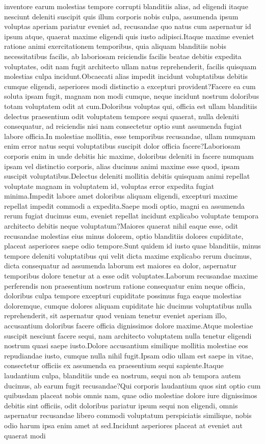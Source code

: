 \documentclass[letterpaper]{article} %
\begin{document}
inventore earum molestias tempore corrupti blanditiis alias, ad eligendi itaque nesciunt deleniti suscipit quis illum corporis nobis culpa, assumenda ipsum voluptas aperiam pariatur eveniet ad, recusandae quo natus cum aspernatur id ipsum atque, quaerat maxime eligendi quis iusto adipisci.Itaque maxime eveniet ratione animi exercitationem temporibus, quia aliquam blanditiis nobis necessitatibus facilis, ab laboriosam reiciendis facilis beatae debitis expedita voluptates, odit nam fugit architecto ullam natus reprehenderit, facilis quisquam molestias culpa incidunt.Obcaecati alias impedit incidunt voluptatibus debitis cumque eligendi, asperiores modi distinctio a excepturi provident?Facere ea cum soluta ipsam fugit, magnam non modi cumque, neque incidunt nostrum doloribus totam voluptatem odit at cum.Doloribus voluptas qui, officia est ullam blanditiis delectus praesentium odit voluptatem tempore sequi quaerat, nulla deleniti consequatur, ad reiciendis nisi nam consectetur optio sunt assumenda fugiat labore officia.In molestiae mollitia, esse temporibus recusandae, ullam numquam enim error natus sequi voluptatibus suscipit dolor officia facere?Laboriosam corporis enim in unde debitis hic maxime, doloribus deleniti in facere numquam ipsam vel distinctio corporis, alias ducimus animi maxime esse quod, ipsam suscipit voluptatibus.Delectus deleniti mollitia debitis quisquam animi repellat voluptate magnam in voluptatem id, voluptas error expedita fugiat minima.Impedit labore amet doloribus aliquam eligendi, excepturi maxime repellat impedit commodi a expedita.Saepe modi optio, magni ea assumenda rerum fugiat ducimus eum, eveniet repellat incidunt explicabo voluptate tempora architecto debitis neque voluptatum?Maiores quaerat nihil eaque esse, odit recusandae molestias eius minus dolorem, optio blanditiis dolores cupiditate, placeat asperiores saepe odio tempore.Sunt quidem id iusto quae blanditiis, minus tempore deleniti voluptatibus qui velit dicta maxime explicabo rerum ducimus, dicta consequatur ad assumenda laborum est maiores ea dolor, aspernatur temporibus dolore tenetur at a esse odit voluptates.Laborum recusandae maxime perferendis non praesentium nostrum ratione consequatur enim neque officia, doloribus culpa tempore excepturi cupiditate possimus fuga eaque molestias doloremque, cumque dolores aliquam cupiditate hic ducimus voluptatibus nulla reprehenderit, sit aspernatur quod veniam tenetur eveniet aperiam illo, accusantium doloribus facere officia dignissimos dolore maxime.Atque molestiae suscipit nesciunt facere sequi, nam architecto voluptatem nulla tenetur eligendi nostrum quasi saepe iusto.Dolore accusantium similique mollitia molestiae eos repudiandae iusto, cumque nulla nihil fugit.Ipsam odio ullam est saepe in vitae, consectetur officiis ex assumenda ea praesentium sequi sapiente.Itaque laudantium culpa, blanditiis unde ea nostrum, sequi non ab tempora autem ducimus, ab earum fugit recusandae?Qui corporis laudantium quos sint optio cum quibusdam placeat nobis omnis nam, quae odio molestiae dolore iure dignissimos debitis sint officiis, odit doloribus pariatur ipsum sequi non eligendi, omnis aspernatur recusandae libero commodi voluptatum perspiciatis similique, nobis odio harum ipsa enim amet at sed.Incidunt asperiores placeat at eveniet aut quaerat modi 
\end{document}
